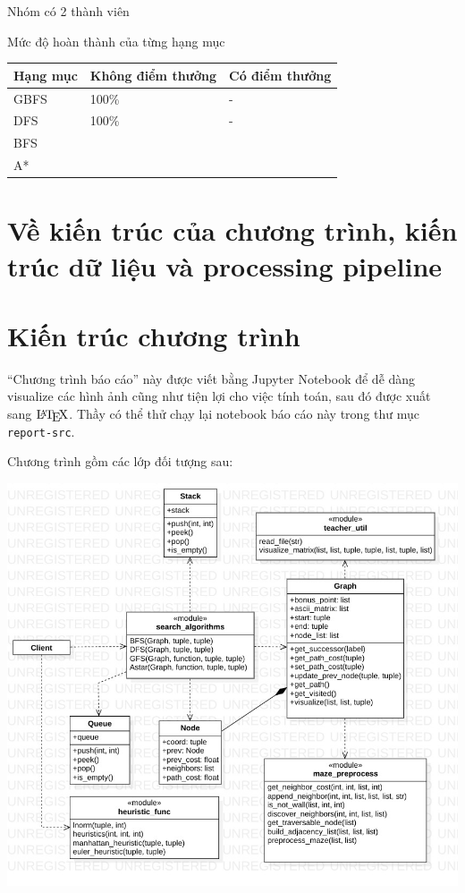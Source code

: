 \documentclass{report}
\let\Oldlatex\LaTeX
\renewcommand{\LaTeX}{\textrm{\Oldlatex}}
\begin{document}
Nhóm có 2 thành viên

Mức độ hoàn thành của từng hạng mục

\begin{longtable}[]{@{}lll@{}}
\toprule
Hạng mục & Không điểm thưởng & Có điểm thưởng \\
\midrule
\endhead
GBFS & 100\% & - \\
DFS & 100\% & - \\
BFS & & \\
A* & & \\
\bottomrule
\end{longtable}

\hypertarget{vux1ec1-kiux1ebfn-truxfac-cux1ee7a-chux1b0ux1a1ng-truxecnh-kiux1ebfn-truxfac-dux1eef-liux1ec7u-vuxe0-processing-pipeline}{%
\section{Về kiến trúc của chương trình, kiến trúc dữ liệu và processing
pipeline}\label{vux1ec1-kiux1ebfn-truxfac-cux1ee7a-chux1b0ux1a1ng-truxecnh-kiux1ebfn-truxfac-dux1eef-liux1ec7u-vuxe0-processing-pipeline}}

\hypertarget{kiux1ebfn-truxfac-chux1b0ux1a1ng-truxecnh}{%
\section{Kiến trúc chương
trình}\label{kiux1ebfn-truxfac-chux1b0ux1a1ng-truxecnh}}

``Chương trình báo cáo'' này được viết bằng Jupyter Notebook để dễ dàng
visualize các hình ảnh cũng như tiện lợi cho việc tính toán, sau đó được
xuất sang \(\LaTeX\). Thầy có thể thử chạy lại notebook báo cáo này
trong thư mục \texttt{report-src}.

Chương trình gồm các lớp đối tượng sau:

\includegraphics{images/ClassDiagram1.jpg}
\end{document}
